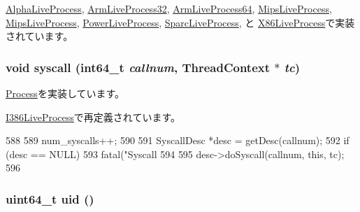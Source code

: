 \hyperlink{classAlphaLiveProcess_aaefd02663c1eae206b851290d9276a5e}{AlphaLiveProcess}, \hyperlink{classArmLiveProcess32_aaefd02663c1eae206b851290d9276a5e}{ArmLiveProcess32}, \hyperlink{classArmLiveProcess64_aaefd02663c1eae206b851290d9276a5e}{ArmLiveProcess64}, \hyperlink{classMipsLiveProcess_aaefd02663c1eae206b851290d9276a5e}{MipsLiveProcess}, \hyperlink{classMipsLiveProcess_aaefd02663c1eae206b851290d9276a5e}{MipsLiveProcess}, \hyperlink{classPowerLiveProcess_aaefd02663c1eae206b851290d9276a5e}{PowerLiveProcess}, \hyperlink{classSparcLiveProcess_aaefd02663c1eae206b851290d9276a5e}{SparcLiveProcess}, と \hyperlink{classX86ISA_1_1X86LiveProcess_aaefd02663c1eae206b851290d9276a5e}{X86LiveProcess}で実装されています。\hypertarget{classLiveProcess_a1ed38802271de4269c3adfa46c73e7e7}{
\subsubsection[{syscall}]{\setlength{\rightskip}{0pt plus 5cm}void syscall (int64\_\-t {\em callnum}, \/  {\bf ThreadContext} $\ast$ {\em tc})}}
\label{classLiveProcess_a1ed38802271de4269c3adfa46c73e7e7}


\hyperlink{classProcess_a0abb4f4856f531e5b48484f5114a5bf9}{Process}を実装しています。

\hyperlink{classX86ISA_1_1I386LiveProcess_a1ed38802271de4269c3adfa46c73e7e7}{I386LiveProcess}で再定義されています。


\begin{DoxyCode}
588 {
589     num_syscalls++;
590 
591     SyscallDesc *desc = getDesc(callnum);
592     if (desc == NULL)
593         fatal("Syscall %
594 
595     desc->doSyscall(callnum, this, tc);
596 }
\end{DoxyCode}
\hypertarget{classLiveProcess_aa371c162844c3023c2c2c98913267482}{
\subsubsection[{uid}]{\setlength{\rightskip}{0pt plus 5cm}uint64\_\-t uid ()}}
\label{classLiveProcess_aa371c162844c3023c2c2c98913267482}




